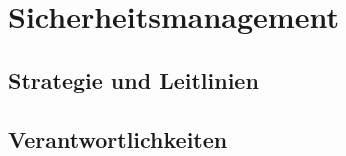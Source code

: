 \section{Sicherheitsmanagement}
\subsection{Strategie und Leitlinien}
\subsection{Verantwortlichkeiten}